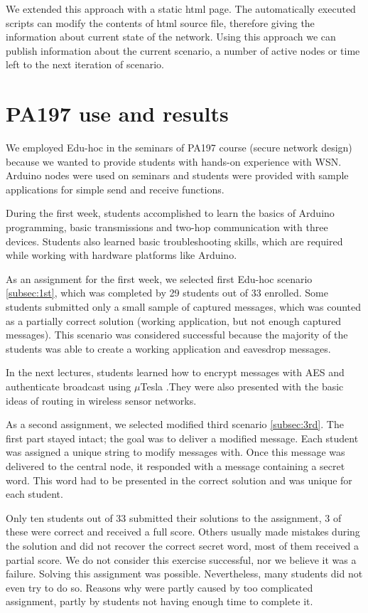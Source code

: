 \documentclass[
  print, %
  Table,   %
  nolof,     %
  nolot,     %
           oneside
]{fithesis3}
\begin{document}
  We extended this approach with a static html page. The automatically executed scripts can modify the contents of html source file, therefore giving the information about current state of the network. Using this approach we can publish information about the current scenario, a number of active nodes or time left to the next iteration of scenario.

  \section{PA197 use and results} \label{sec:PA197}
  We employed Edu-hoc in the seminars of PA197 course (secure network design)  because we wanted to provide students with hands-on experience with WSN. Arduino nodes were used on seminars and students were provided with sample applications for simple send and receive functions.

  During the first week, students accomplished to learn the basics of Arduino programming, basic transmissions and two-hop communication with three devices. Students also learned basic troubleshooting skills, which are required while working with hardware platforms like Arduino.

  As an assignment for the first week, we selected first Edu-hoc scenario \ref{subsec:1st}, which was completed by 29 students out of 33 enrolled. Some students submitted only a small sample of captured messages, which was counted as a partially correct solution (working application, but not enough captured messages). This scenario was considered successful because the majority of the students was able to create a working application and eavesdrop messages.

  In the next lectures, students learned how to encrypt messages with AES  and authenticate broadcast using $\mu$Tesla \cite{perrig2002spins}.They were also presented with the basic ideas of routing in wireless sensor networks.

  As a second assignment, we selected modified third scenario \ref{subsec:3rd}. The first part stayed intact; the goal was to deliver a modified message. Each student was assigned a unique string to modify messages with. Once this message was delivered to the central node, it responded with a message containing a secret word. This word had to be presented in the correct solution and was unique for each student.

   Only ten students out of 33 submitted their solutions to the assignment, 3 of these were correct and received a full score. Others usually made mistakes during the solution and did not recover the correct secret word, most of them received a partial score. We do not consider this exercise successful, nor we believe it was a failure. Solving this assignment was possible. Nevertheless, many students did not even try to do so. Reasons why were partly caused by too complicated assignment, partly by students not having enough time to complete it.
\end{document}
